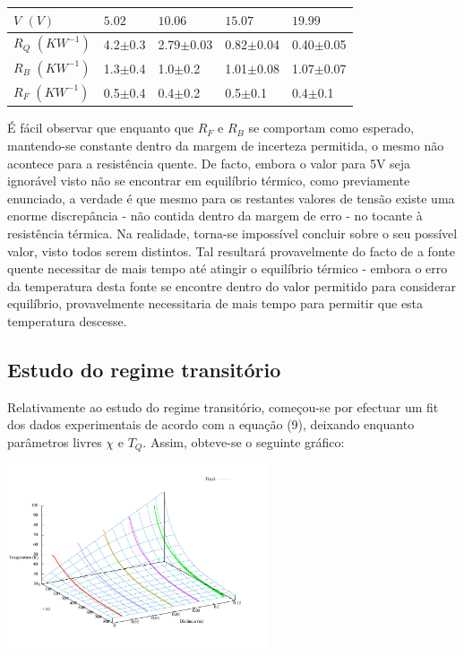 \documentclass[8pt]{extarticle}
\begin{document}
\begin{multicols}{2}
{\small
\begin{center}
\begin{tabular}{ x{1.8cm} x{1.3cm} x{1.3cm} x{1.3cm} x{1.3cm} } 
$V$ $(V)$ & $5.02$ & $10.06$ & $15.07$ & $19.99$ \tabularnewline
\hline \hline
$R_Q$ $(KW^{-1})$ & 4.2$\pm$0.3 & 2.79$\pm$0.03 & 0.82$\pm$0.04 & 0.40$\pm$0.05 \tabularnewline
$R_B$ $(KW^{-1})$ & 1.3$\pm$0.4 & 1.0$\pm$0.2 & 1.01$\pm$0.08 & 1.07$\pm$0.07 \tabularnewline
$R_F$ $(KW^{-1})$ & 0.5$\pm$0.4 & 0.4$\pm$0.2 & 0.5$\pm$0.1 & 0.4$\pm$0.1 \tabularnewline
\end{tabular}
\par{}
\end{center}
}

\par É fácil observar que enquanto que $R_F$ e $R_B$ se comportam como esperado, mantendo-se constante dentro da margem de incerteza permitida, o mesmo não acontece para a resistência quente. De facto, embora o valor para 5V seja ignorável visto não se encontrar em equilíbrio térmico, como previamente enunciado, a verdade é que mesmo para os restantes valores de tensão existe uma enorme discrepância - não contida dentro da margem de erro - no tocante à resistência térmica. Na realidade, torna-se impossível concluir sobre o seu possível valor, visto todos serem distintos. Tal resultará provavelmente do facto de a fonte quente necessitar de mais tempo até atingir o equilíbrio térmico - embora o erro da temperatura desta fonte se encontre dentro do valor permitido para considerar equilíbrio, provavelmente necessitaria de mais tempo para permitir que esta temperatura descesse. 

\subsection*{Estudo do regime transitório}

\par Relativamente ao estudo do regime transitório, começou-se por efectuar um fit dos dados experimentais de acordo com a equação (9), deixando enquanto parâmetros livres $\chi$ e $T_Q$. Assim, obteve-se o seguinte gráfico:

\begin{center}
\includegraphics[width=220pt]{trans_nao_ajustado.pdf}
\par{}
\end{center}


\end{multicols}
\end{document}
